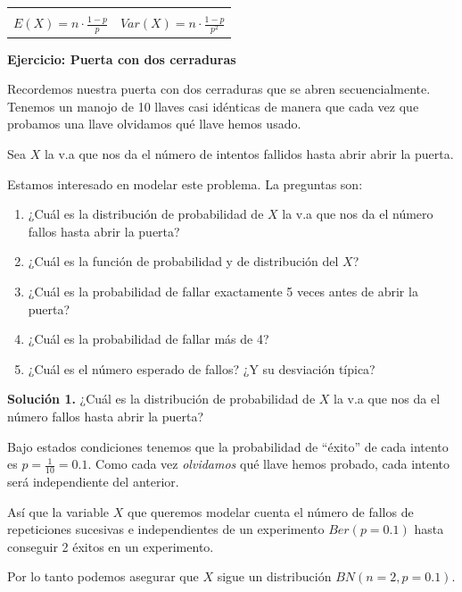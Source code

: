 \documentclass[]{book}
\providecommand{\tightlist}{%
  \setlength{\itemsep}{0pt}\setlength{\parskip}{0pt}}
\begin{document}
\begin{longtable}[]{@{}rl@{}}
\begin{minipage}[t]{0.44\columnwidth}
\end{minipage}\tabularnewline
\begin{minipage}[t]{0.50\columnwidth}\raggedleft
\(E(X)=n\cdot\frac{1-p}{p}\)\strut
\end{minipage} & \begin{minipage}[t]{0.44\columnwidth}\raggedright
\(Var(X)=n\cdot \frac{1-p}{p^2}\)\strut
\end{minipage}\tabularnewline
\bottomrule
\end{longtable}

\textbf{Ejercicio: Puerta con dos cerraduras}

Recordemos nuestra puerta con dos cerraduras que se abren secuencialmente. Tenemos un manojo de 10 llaves casi idénticas de manera que cada vez que probamos una llave olvidamos qué llave hemos usado.

Sea \(X\) la v.a que nos da el número de intentos fallidos hasta abrir abrir la puerta.

Estamos interesado en modelar este problema. La preguntas son:

\begin{enumerate}
\def\labelenumi{\arabic{enumi}.}
\tightlist
\item
  ¿Cuál es la distribución de probabilidad de \(X\) la v.a que nos da el número fallos hasta abrir la puerta?
\item
  ¿Cuál es la función de probabilidad y de distribución del \(X\)?
\item
  ¿Cuál es la probabilidad de fallar exactamente 5 veces antes de abrir la puerta?
\item
  ¿Cuál es la probabilidad de fallar más de 4?
\item
  ¿Cuál es el número esperado de fallos? ¿Y su desviación típica?
\end{enumerate}

\textbf{Solución 1.} ¿Cuál es la distribución de probabilidad de \(X\) la v.a que nos da el número fallos hasta abrir la puerta?

Bajo estados condiciones tenemos que la probabilidad de ``éxito'' de cada intento es \(p=\frac{1}{10}=0.1\). Como cada vez \emph{olvidamos} qué llave hemos probado, cada intento será independiente del anterior.

Así que la variable \(X\) que queremos modelar cuenta el número de fallos de repeticiones sucesivas e independientes de un experimento \(Ber(p=0.1)\) hasta conseguir 2 éxitos en un experimento.

Por lo tanto podemos asegurar que \(X\) sigue un distribución \(BN(n=2,p=0.1).\)
\end{document}
